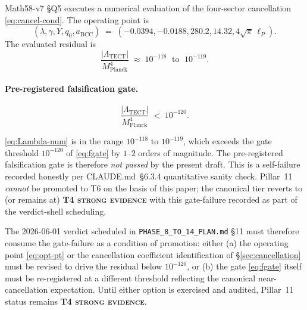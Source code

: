 Math58-v7 §Q5 executes a numerical evaluation of the four-sector
cancellation \eqref{eq:cancel-cond}. The operating point is
\begin{equation}\label{eq:opt-pt}
  (\lambda,\gamma,Y,q_0,a_{\mathrm{BCC}})
  \;=\; (-0.0394,-0.0188,280.2,14.32,4\sqrt{\pi}\,\ell_P).
\end{equation}
The evaluated residual is
\begin{equation}\label{eq:Lambda-num}
  \frac{|\Lambda_{\mathrm{TECT}}|}{M_{\mathrm{Planck}}^4}
  \;\approx\; 10^{-118}\;\text{ to }\;10^{-119}.
\end{equation}

\paragraph{Pre-registered falsification gate.}
\begin{equation}\label{eq:fgate}
  \frac{|\Lambda_{\mathrm{TECT}}|}{M_{\mathrm{Planck}}^4}
  \;<\; 10^{-120}.
\end{equation}

\begin{remark}\label{rmk:gate-fail}
\eqref{eq:Lambda-num} is in the range $10^{-118}$ to $10^{-119}$,
which exceeds the gate threshold $10^{-120}$ of \eqref{eq:fgate} by
$1$--$2$ orders of magnitude. The pre-registered falsification gate
is therefore \emph{not passed} by the present draft. This is a
self-failure recorded honestly per CLAUDE.md~§6.3.4 quantitative
sanity check. Pillar~11 \emph{cannot} be promoted to T6 on the
basis of this paper; the canonical tier reverts to (or remains at)
\textbf{T4 \textsc{strong evidence}} with this gate-failure
recorded as part of the verdict-shell scheduling.
\end{remark}

The 2026-06-01 verdict scheduled in
\texttt{PHASE\_8\_TO\_14\_PLAN.md} §11 must therefore consume the
gate-failure as a condition of promotion: either (a) the operating
point \eqref{eq:opt-pt} or the cancellation coefficient identification
of \S\ref{sec:cancellation} must be revised to drive the residual
below $10^{-120}$, or (b) the gate \eqref{eq:fgate} itself must be
re-registered at a different threshold reflecting the canonical
near-cancellation expectation. Until either option is exercised and
audited, Pillar~11 status remains \textbf{T4 \textsc{strong
evidence}}.

